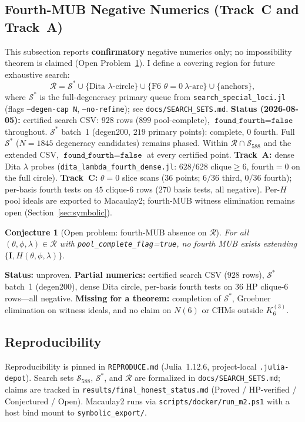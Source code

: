 \documentclass[onecolumn]{IEEEtran}
\newcommand{\repo}[1]{{\ttfamily\nolinkurl{#1}}}
\newtheorem{conjecture}{Conjecture}
\begin{document}
\subsection{Fourth-MUB Negative Numerics (Track~C and Track~A)}
\label{sec:trackc}
This subsection reports \textbf{confirmatory} negative numerics only; no impossibility theorem is claimed (Open Problem~\ref{op:trackc}).
I define a covering region for future exhaustive search:
\[
\mathcal{R}=\mathcal{S}^*\cup\{\text{Dita }\lambda\text{-circle}\}\cup\{\text{F6 }\theta=0\ \lambda\text{-arc}\}\cup\{\text{anchors}\},
\]
where $\mathcal{S}^*$ is the full-degeneracy primary queue from \repo{search_special_loci.jl} (flags \texttt{--degen-cap N}, \texttt{--no-refine}); see \repo{docs/SEARCH_SETS.md}.
\textbf{Status (2026-08-05):} certified search CSV: $928$ rows ($899$ pool-complete), $\texttt{found\_fourth}=\texttt{false}$ throughout.
$\mathcal{S}^*$ batch~1 (degen200, $219$ primary points): complete, $0$ fourth.
Full $\mathcal{S}^*$ ($N{=}1845$ degeneracy candidates) remains phased.
Within $\mathcal{R}\cap\mathcal{S}_{588}$ and the extended CSV, $\texttt{found\_fourth}=\texttt{false}$ at every certified point.
\textbf{Track~A:} dense Dita $\lambda$ probes (\repo{dita_lambda_fourth_dense.jl}: $628/628$ clique$\ge6$, fourth$=0$ on the full circle).
\textbf{Track~C:} $\theta{=}0$ slice scans ($36$ points; $6/36$ third, $0/36$ fourth); per-basis fourth tests on $45$ clique-$6$ rows ($270$ basis tests, all negative).
Per-$H$ pool ideals are exported to Macaulay2; fourth-MUB witness elimination remains open (Section~\ref{sec:symbolic}).

\begin{conjecture}[Open problem: fourth-MUB absence on $\mathcal{R}$]
\label{op:trackc}
For all $(\theta,\phi,\lambda)\in\mathcal{R}$ with \texttt{pool\_complete\_flag}=\texttt{true}, no fourth MUB exists extending $\{\mathbf{I},H(\theta,\phi,\lambda)\}$.
\end{conjecture}
\noindent
\textbf{Status:} unproven.
\textbf{Partial numerics:} certified search CSV ($928$ rows), $\mathcal{S}^*$ batch~1 (degen200), dense Dita circle, per-basis fourth tests on $36$ HP clique-$6$ rows---all negative.
\textbf{Missing for a theorem:} completion of $\mathcal{S}^*$, Groebner elimination on witness ideals, and no claim on $N(6)$ or CHMs outside $K_6^{(3)}$.

\subsection{Reproducibility}
\label{sec:infra}
Reproducibility is pinned in \repo{REPRODUCE.md} (Julia~1.12.6, project-local \repo{.julia-depot}).
Search sets $\mathcal{S}_{588}$, $\mathcal{S}^*$, and $\mathcal{R}$ are formalized in \repo{docs/SEARCH_SETS.md}; claims are tracked in \repo{results/final_honest_status.md} (Proved / HP-verified / Conjectured / Open).
Macaulay2 runs via \repo{scripts/docker/run_m2.ps1} with a host bind mount to \repo{symbolic_export/}.
\end{document}
